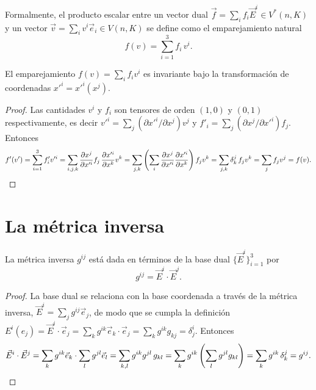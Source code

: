 \begin{observacion}
Formalmente, el producto escalar entre un vector dual $\vec f = \sum_i
f_i \vec E^i \in V^*(n,K)$ y un vector $\vec v = \sum_i v^i \vec e_i \in
V(n,K)$ se define como el emparejamiento natural
\[
f(v) = \sum_{i=1}^{3} f_i\, v^i .
\]
\end{observacion}

\begin{proposicionc}
El emparejamiento $f(v) = \sum_i f_i v^i$ es invariante bajo la
transformación de coordenadas $x'^i=x'^i(x^j)$.
\end{proposicionc}

\begin{proof}
Las cantidades $v^i$ y $f_i$ son tensores de orden $(1,0)$ y $(0,1)$
respectivamente, es decir $v'^i = \sum_j (\partial x'^i/\partial x^j)
v^j$ y $f'_i = \sum_j (\partial x^j/\partial x'^i) f_j$. Entonces
\[
f'(v') = \sum_{i=1}^3 f'_i v'^i = \sum_{i,j,k}\frac{\partial
x^j}{\partial x'^i} f_j\, \frac{\partial x'^i}{\partial x^k} v^k =
\sum_{j,k}\left(\sum_i \frac{\partial x^j}{\partial x'^i}\frac{\partial
x'^i}{\partial x^k}\right) f_j v^k = \sum_{j,k} \delta^j_k\, f_j v^k =
\sum_{j} f_j v^j = f(v). \qedhere
\]
\end{proof}

\newpage
\section{La métrica inversa}

\begin{proposicionc}
La métrica inversa $g^{ij}$ está dada en términos de la base dual
$\{\vec E^i\}_{i=1}^3$ por
\[
g^{ij} = \vec E^i \cdot \vec E^j .
\]
\end{proposicionc}

\begin{proof}
La base dual se relaciona con la base coordenada a través de la métrica
inversa, $\vec E^i = \sum_j g^{ij} \vec e_j$, de modo que se cumpla la
definición $E^i(e_j) = \vec E^i\cdot\vec e_j = \sum_k g^{ik}\vec
e_k\cdot\vec e_j = \sum_k g^{ik} g_{kj} = \delta^i_j$. Entonces
\[
\vec E^i\cdot\vec E^j = \sum_{k} g^{ik}\vec e_k \cdot \sum_{l} g^{jl}\vec
e_l = \sum_{k,l} g^{ik} g^{jl}\, g_{kl} = \sum_k g^{ik}\left(\sum_l
g^{jl}g_{kl}\right) = \sum_k g^{ik}\, \delta^j_k = g^{ij} . \qedhere
\]
\end{proof}

